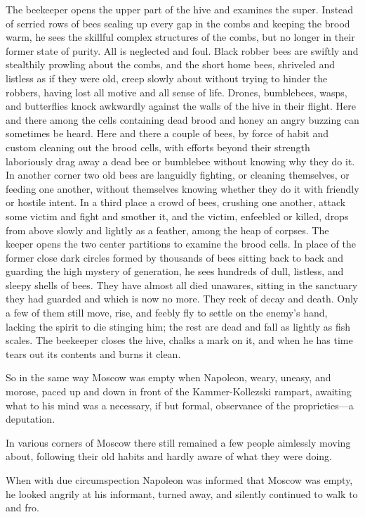 The beekeeper opens the upper part of the hive and examines the
super.  Instead of serried rows of bees sealing up every gap in
the combs and keeping the brood warm, he sees the skillful
complex structures of the combs, but no longer in their former
state of purity. All is neglected and foul. Black robber bees are
swiftly and stealthily prowling about the combs, and the short
home bees, shriveled and listless as if they were old, creep
slowly about without trying to hinder the robbers, having lost
all motive and all sense of life. Drones, bumblebees, wasps, and
butterflies knock awkwardly against the walls of the hive in
their flight. Here and there among the cells containing dead
brood and honey an angry buzzing can sometimes be heard. Here and
there a couple of bees, by force of habit and custom cleaning out
the brood cells, with efforts beyond their strength laboriously
drag away a dead bee or bumblebee without knowing why they do
it. In another corner two old bees are languidly fighting, or
cleaning themselves, or feeding one another, without themselves
knowing whether they do it with friendly or hostile intent. In a
third place a crowd of bees, crushing one another, attack some
victim and fight and smother it, and the victim, enfeebled or
killed, drops from above slowly and lightly as a feather, among
the heap of corpses. The keeper opens the two center partitions
to examine the brood cells. In place of the former close dark
circles formed by thousands of bees sitting back to back and
guarding the high mystery of generation, he sees hundreds of
dull, listless, and sleepy shells of bees. They have almost all
died unawares, sitting in the sanctuary they had guarded and
which is now no more. They reek of decay and death. Only a few of
them still move, rise, and feebly fly to settle on the enemy's
hand, lacking the spirit to die stinging him; the rest are dead
and fall as lightly as fish scales. The beekeeper closes the
hive, chalks a mark on it, and when he has time tears out its
contents and burns it clean.

So in the same way Moscow was empty when Napoleon, weary, uneasy,
and morose, paced up and down in front of the Kammer-Kollezski
rampart, awaiting what to his mind was a necessary, if but
formal, observance of the proprieties---a deputation.

In various corners of Moscow there still remained a few people
aimlessly moving about, following their old habits and hardly
aware of what they were doing.

When with due circumspection Napoleon was informed that Moscow
was empty, he looked angrily at his informant, turned away, and
silently continued to walk to and fro.

